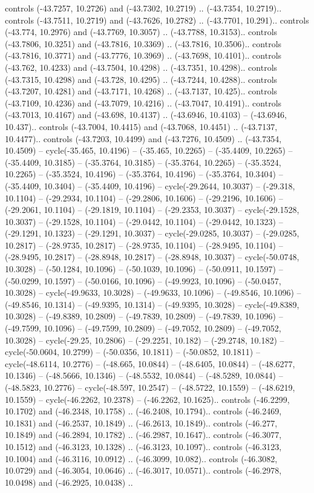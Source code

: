 \begin{scope}[shift={(2.5552, 9.9912)}]
\begin{scope}[shift={(48.1654, -14.8546)}]
controls (-43.7257, 10.2726) and (-43.7302, 10.2719) .. (-43.7354, 10.2719).. controls (-43.7511, 10.2719) and (-43.7626, 10.2782) .. (-43.7701, 10.291).. controls (-43.774, 10.2976) and (-43.7769, 10.3057) .. (-43.7788, 10.3153).. controls (-43.7806, 10.3251) and (-43.7816, 10.3369) .. (-43.7816, 10.3506).. controls (-43.7816, 10.3771) and (-43.7776, 10.3969) .. (-43.7698, 10.4101).. controls (-43.762, 10.4233) and (-43.7504, 10.4298) .. (-43.7351, 10.4298).. controls (-43.7315, 10.4298) and (-43.728, 10.4295) .. (-43.7244, 10.4288).. controls (-43.7207, 10.4281) and (-43.7171, 10.4268) .. (-43.7137, 10.425).. controls (-43.7109, 10.4236) and (-43.7079, 10.4216) .. (-43.7047, 10.4191).. controls (-43.7013, 10.4167) and (-43.698, 10.4137) .. (-43.6946, 10.4103) -- (-43.6946, 10.437).. controls (-43.7004, 10.4415) and (-43.7068, 10.4451) .. (-43.7137, 10.4477).. controls (-43.7203, 10.4499) and (-43.7276, 10.4509) .. (-43.7354, 10.4509) -- cycle(-35.465, 10.4196) -- (-35.465, 10.2265) -- (-35.4409, 10.2265) -- (-35.4409, 10.3185) -- (-35.3764, 10.3185) -- (-35.3764, 10.2265) -- (-35.3524, 10.2265) -- (-35.3524, 10.4196) -- (-35.3764, 10.4196) -- (-35.3764, 10.3404) -- (-35.4409, 10.3404) -- (-35.4409, 10.4196) -- cycle(-29.2644, 10.3037) -- (-29.318, 10.1104) -- (-29.2934, 10.1104) -- (-29.2806, 10.1606) -- (-29.2196, 10.1606) -- (-29.2061, 10.1104) -- (-29.1819, 10.1104) -- (-29.2353, 10.3037) -- cycle(-29.1528, 10.3037) -- (-29.1528, 10.1104) -- (-29.0442, 10.1104) -- (-29.0442, 10.1323) -- (-29.1291, 10.1323) -- (-29.1291, 10.3037) -- cycle(-29.0285, 10.3037) -- (-29.0285, 10.2817) -- (-28.9735, 10.2817) -- (-28.9735, 10.1104) -- (-28.9495, 10.1104) -- (-28.9495, 10.2817) -- (-28.8948, 10.2817) -- (-28.8948, 10.3037) -- cycle(-50.0748, 10.3028) -- (-50.1284, 10.1096) -- (-50.1039, 10.1096) -- (-50.0911, 10.1597) -- (-50.0299, 10.1597) -- (-50.0166, 10.1096) -- (-49.9923, 10.1096) -- (-50.0457, 10.3028) -- cycle(-49.9633, 10.3028) -- (-49.9633, 10.1096) -- (-49.8546, 10.1096) -- (-49.8546, 10.1314) -- (-49.9395, 10.1314) -- (-49.9395, 10.3028) -- cycle(-49.8389, 10.3028) -- (-49.8389, 10.2809) -- (-49.7839, 10.2809) -- (-49.7839, 10.1096) -- (-49.7599, 10.1096) -- (-49.7599, 10.2809) -- (-49.7052, 10.2809) -- (-49.7052, 10.3028) -- cycle(-29.25, 10.2806) -- (-29.2251, 10.182) -- (-29.2748, 10.182) -- cycle(-50.0604, 10.2799) -- (-50.0356, 10.1811) -- (-50.0852, 10.1811) -- cycle(-48.6114, 10.2776) -- (-48.665, 10.0844) -- (-48.6405, 10.0844) -- (-48.6277, 10.1346) -- (-48.5666, 10.1346) -- (-48.5532, 10.0844) -- (-48.5289, 10.0844) -- (-48.5823, 10.2776) -- cycle(-48.597, 10.2547) -- (-48.5722, 10.1559) -- (-48.6219, 10.1559) -- cycle(-46.2262, 10.2378) -- (-46.2262, 10.1625).. controls (-46.2299, 10.1702) and (-46.2348, 10.1758) .. (-46.2408, 10.1794).. controls (-46.2469, 10.1831) and (-46.2537, 10.1849) .. (-46.2613, 10.1849).. controls (-46.277, 10.1849) and (-46.2894, 10.1782) .. (-46.2987, 10.1647).. controls (-46.3077, 10.1512) and (-46.3123, 10.1328) .. (-46.3123, 10.1097).. controls (-46.3123, 10.1004) and (-46.3116, 10.0912) .. (-46.3099, 10.082).. controls (-46.3082, 10.0729) and (-46.3054, 10.0646) .. (-46.3017, 10.0571).. controls (-46.2978, 10.0498) and (-46.2925, 10.0438) .. 
\end{scope}
\end{scope}

